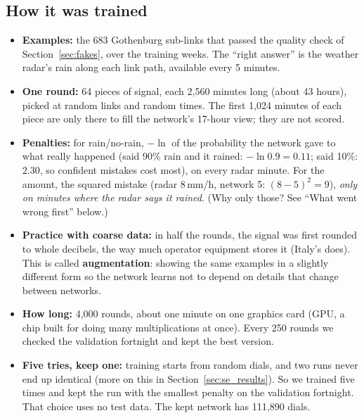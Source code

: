 \subsection{How it was trained}
\begin{itemize}
\item \textbf{Examples:} the 683 Gothenburg sub-links that passed the quality check of Section~\ref{sec:fakes}, over the training
weeks. The ``right answer'' is the weather radar's rain along each link path, available every 5 minutes.
\item \textbf{One round:} 64 pieces of signal, each 2{,}560 minutes long (about 43 hours), picked at random links and
random times. The first 1{,}024 minutes of each piece are only there to fill the network's 17-hour view; they are not
scored.
\item \textbf{Penalties:} for rain/no-rain, $-\ln$ of the probability the network gave to what really happened
(said 90\% rain and it rained: $-\ln 0.9 = 0.11$; said 10\%: $2.30$, so confident mistakes cost most), on every radar
minute. For the amount, the squared mistake (radar 8\,mm/h, network 5: $(8-5)^2=9$), \emph{only on minutes where the
radar says it rained}. (Why only those? See ``What went wrong first'' below.)
\item \textbf{Practice with coarse data:} in half the rounds, the signal was first rounded to whole decibels, the way
much operator equipment stores it (Italy's does). This is called \textbf{augmentation}: showing the same examples in
a slightly different form so the network learns not to depend on details that change between networks.
\item \textbf{How long:} 4{,}000 rounds, about one minute on one graphics card (GPU, a chip built for doing many
multiplications at once). Every 250 rounds we checked the validation fortnight and kept the best version.
\item \textbf{Five tries, keep one:} training starts from random dials, and two runs never end up identical (more on this
in Section~\ref{sec:se_results}). So we trained five times and kept the run with the smallest penalty on the validation
fortnight. That choice uses no test data. The kept network has 111{,}890 dials.
\end{itemize}

